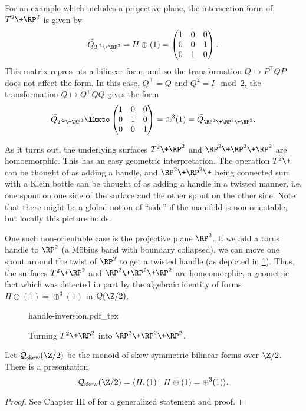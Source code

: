 \begin{example}
For an example which includes a projective plane, the intersection form of $T^2\+ \RP^2$ is given by
\[
	\widetilde{Q}_{T^2\+ \RP^2} = H\oplus (1)=
	\begin{pmatrix}
		1 & 0 & 0 \\
		0 & 0 & 1 \\
		0 & 1 & 0
	\end{pmatrix}.
\]
This matrix represents a bilinear form, and so the transformation $Q\mapsto P^\intercal Q P$ does not affect the form. In this case, $Q^\intercal =Q$ and $Q^2=I\mod 2$, the transformation $Q\mapsto Q^\intercal Q Q$ gives the form
\[
	\widetilde{Q}_{T^2\+ \RP^2}
	\lkxto \begin{pmatrix}
		1 & 0 & 0 \\
		0 & 1 & 0 \\
		0 & 0 & 1
	\end{pmatrix} =\oplus^3(1)= \widetilde{Q}_{\RP^2\+\RP^2\+\RP^2}.
\]
\end{example}
As it turns out, the underlying surfaces $T^2\+\RP^2$ and $\RP^2\+\RP^2\+\RP^2$ are homoemorphic. This has an easy geometric interpretation. The operation $T^2\+$ can be thought of as adding a handle, and $\RP^2\+\RP^2\+$ being connected sum with a Klein bottle can be thought of as adding a handle in a twisted manner, i.e. one spout on one side of the surface and the other spout on the other side. Note that there might be a global notion of ``side'' if the manifold is non-orientable, but locally this picture holds.

One such non-orientable case is the projective plane $\RP^2$. If we add a torus handle to $\RP^2$ (a M\"obius band with boundary collapsed), we can move one spout around the twist of $\RP^2$ to get a twisted handle (as depicted in \cref{fig:twisted-handle-to-handle}). Thus, the surfaces $T^2\+\RP^2$ and $\RP^2\+\RP^2\+\RP^2$ are homeomorphic, a geometric fact which was detected in part by the algebraic identity of forms $H\oplus (1)=\oplus^3(1)$ in $\mathcal{Q}(\Z/2)$.

\begin{figure}[ht]
	\centering
	{handle-inversion.pdf_tex}
	\caption{Turning $T^2\+\RP^2$ into $\RP^2\+\RP^2\+\RP^2$.}\label{fig:twisted-handle-to-handle}
\end{figure}

\begin{proposition}
	Let $\mathcal{Q}_{\mathrm{skew}}(\Z/2)$ be the monoid of skew-symmetric bilinear forms over $\Z/2$. There is a presentation
	\[\mathcal{Q}_{\mathrm{skew}}(\Z/2) = \langle H, (1) \mid H\oplus (1) = \oplus^3 (1)\rangle.\]
\end{proposition}
\begin{proof}
	See Chapter III of \cite{milnorhuse1973forms} for a generalized statement and proof.
\end{proof}

